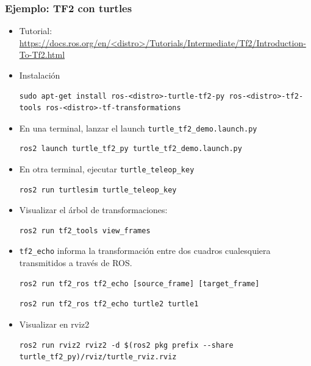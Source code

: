 \begin{frame}[fragile]
	\frametitle{Ejemplo: TF2 con turtles}
    \scriptsize
	\begin{itemize}
        \item Tutorial: \url{https://docs.ros.org/en/<distro>/Tutorials/Intermediate/Tf2/Introduction-To-Tf2.html}
        \item Instalación
        \begin{lstlisting}[style=bash] 
sudo apt-get install ros-<distro>-turtle-tf2-py ros-<distro>-tf2-tools ros-<distro>-tf-transformations
        \end{lstlisting}
        
        \item En una terminal, lanzar el launch \lstinline[style=bash]{turtle_tf2_demo.launch.py}
        
        \begin{lstlisting}[style=bash] 
ros2 launch turtle_tf2_py turtle_tf2_demo.launch.py
        \end{lstlisting}
        
        \item En otra terminal, ejecutar \lstinline[style=bash]{turtle_teleop_key}
        
        \begin{lstlisting}[style=bash] 
ros2 run turtlesim turtle_teleop_key
        \end{lstlisting}
        
        \item Visualizar el árbol de transformaciones:
        
        \begin{lstlisting}[style=bash] 
ros2 run tf2_tools view_frames
        \end{lstlisting}
        
        \item \lstinline[style=bash]{tf2_echo} informa la transformación entre dos cuadros cualesquiera transmitidos a través de ROS.
        
        \begin{lstlisting}[style=bash] 
ros2 run tf2_ros tf2_echo [source_frame] [target_frame]
        \end{lstlisting}

        \begin{lstlisting}[style=bash] 
ros2 run tf2_ros tf2_echo turtle2 turtle1
        \end{lstlisting}
        
        \item Visualizar en rviz2
        
        \begin{lstlisting}[style=bash] 
ros2 run rviz2 rviz2 -d $(ros2 pkg prefix --share turtle_tf2_py)/rviz/turtle_rviz.rviz
        \end{lstlisting}
        
    \end{itemize}
\end{frame}

